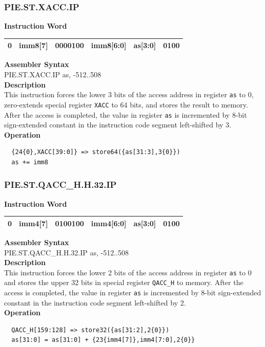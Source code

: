 \newpage
\subsubsection{PIE.ST.XACC.IP}\label{instruction:PIESTXACCIP}
\setlength\tabcolsep{6pt}
\textbf{Instruction Word} \\
\begin{tabular}{|c|c|c|c|c|c|}
	\hline
	0 & imm8[7] & 0000100 & imm8[6:0] & as[3:0] & 0100 \\
	\hline
\end{tabular}

\textbf{Assembler Syntax} \\
PIE.ST.XACC.IP as, -512..508 \\
\textbf{Description} \\
This instruction forces the lower 3 bits of the access address in register \lstinline{as} to 0, zero-extends special register \lstinline{XACC} to 64 bits, and stores the result to memory. After the access is completed, the value in register \lstinline{as} is incremented by 8-bit sign-extended constant in the instruction code segment left-shifted by 3.\\
\textbf{Operation}
\begin{lstlisting}
  {24{0},XACC[39:0]} => store64({as[31:3],3{0}})
  as += imm8
\end{lstlisting}

\newpage
\subsubsection{PIE.ST.QACC\_H.H.32.IP}\label{instruction:PIESTQACCHH32IP}
\setlength\tabcolsep{6pt}
\textbf{Instruction Word} \\
\begin{tabular}{|c|c|c|c|c|c|}
	\hline
	0 & imm4[7] & 0100100 & imm4[6:0] & as[3:0] & 0100 \\
	\hline
\end{tabular}

\textbf{Assembler Syntax} \\
PIE.ST.QACC\_H.H.32.IP as, -512..508 \\
\textbf{Description} \\
This instruction forces the lower 2 bits of the access address in register \lstinline{as} to 0 and stores the upper 32 bits in special register \lstinline{QACC_H} to memory. After the access is completed, the value in register \lstinline{as} is incremented by 8-bit sign-extended constant in the instruction code segment left-shifted by 2.\\
\textbf{Operation}
\begin{lstlisting}
  QACC_H[159:128] => store32({as[31:2],2{0}})
  as[31:0] = as[31:0] + {23{imm4[7]},imm4[7:0],2{0}}
\end{lstlisting}

